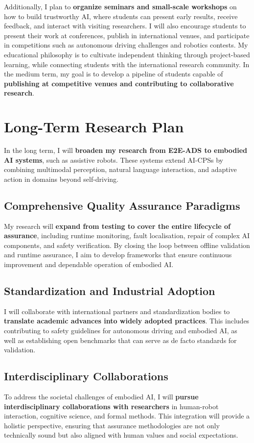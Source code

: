 \documentclass[12pt,a4paper]{article}
\begin{document}
Additionally, I plan to \textbf{organize seminars and small-scale workshops} on how to build trustworthy AI, where students can present early results, receive feedback, and interact with visiting researchers. I will also encourage students to present their work at conferences, publish in international venues, and participate in competitions such as autonomous driving challenges and robotics contests. My educational philosophy is to cultivate independent thinking through project-based learning, while connecting students with the international research community. In the medium term, my goal is to develop a pipeline of students capable of \textbf{publishing at competitive venues and contributing to collaborative research}.

\section{Long-Term Research Plan}

In the long term, I will \textbf{broaden my research from E2E-ADS to embodied AI systems}, such as assistive robots. These systems extend AI-CPSs by combining multimodal perception, natural language interaction, and adaptive action in domains beyond self-driving.

\subsection{Comprehensive Quality Assurance Paradigms}
My research will \textbf{expand from testing to cover the entire lifecycle of assurance}, including runtime monitoring, fault localisation, repair of complex AI components, and safety verification. By closing the loop between offline validation and runtime assurance, I aim to develop frameworks that ensure continuous improvement and dependable operation of embodied AI.

\subsection{Standardization and Industrial Adoption}
I will collaborate with international partners and standardization bodies to \textbf{translate academic advances into widely adopted practices}. This includes contributing to safety guidelines for autonomous driving and embodied AI, as well as establishing open benchmarks that can serve as de facto standards for validation.

\subsection{Interdisciplinary Collaborations}
To address the societal challenges of embodied AI, I will \textbf{pursue interdisciplinary collaborations with researchers} in human-robot interaction, cognitive science, and formal methods. This integration will provide a holistic perspective, ensuring that assurance methodologies are not only technically sound but also aligned with human values and social expectations.
\end{document}

